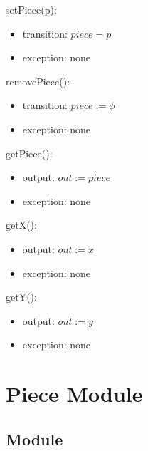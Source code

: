 \documentclass[12pt]{article}
\begin{document}
\noindent setPiece(p):
\begin{itemize}
\item transition: $piece = p$
\item exception: none
\end{itemize}

\noindent removePiece():
\begin{itemize}
\item transition: $piece := \phi$
\item exception: none
\end{itemize}

\noindent getPiece():
\begin{itemize}
\item output: $out := piece$
\item exception: none
\end{itemize}

\noindent getX():
\begin{itemize}
\item output: $out := x$
\item exception: none
\end{itemize}

\noindent getY():
\begin{itemize}
\item output: $out := y$
\item exception: none
\end{itemize}

\newpage



































\section* {Piece Module}

\subsection*{Module}
\end{document}
